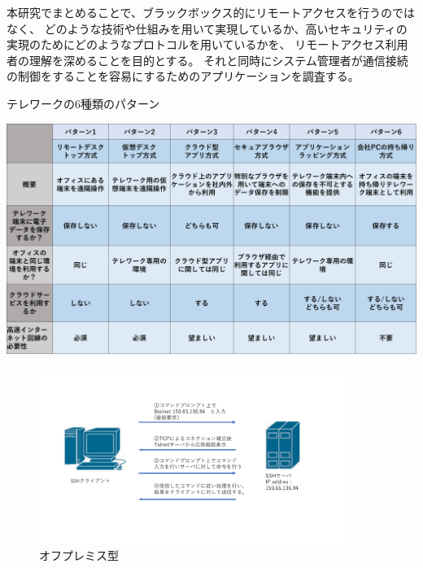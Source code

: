 \documentclass[11pt,a4j,titlepage]{jreport}
\begin{document}

本研究でまとめることで、ブラックボックス的にリモートアクセスを行うのではなく、
どのような技術や仕組みを用いて実現しているか、高いセキュリティの実現のためにどのようなプロトコルを用いているかを、
リモートアクセス利用者の理解を深めることを目的とする。
それと同時にシステム管理者が通信接続の制御をすることを容易にするためのアプリケーションを調査する。


\begin{table}[h]
    \centering
    \caption{テレワークの6種類のパターン}
    \includegraphics*[width=1.0\textwidth,page=1]{graphs/telework_list.pdf}
    \label{telework_table}
\end{table}


\begin{figure}[h]
    \centering
    \includegraphics*[width=0.9\textwidth,page=14]{graphs/network_archtecture.pdf}
    \caption{ オフプレミス型}
    \label{cloud_graph}
\end{figure}
\end{document}
